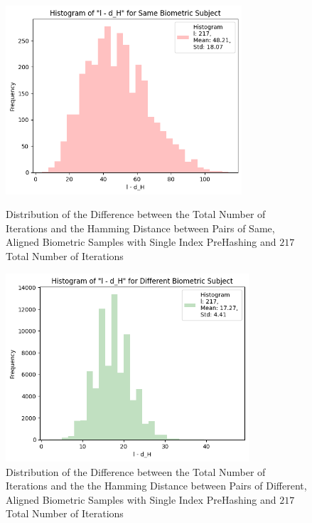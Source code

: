 \begin{enumerate}
\begin{itemize}
            \begin{figure}[H]
                \centering
                \begin{minipage}[b]{0.48\linewidth}
                    \centering
                    \includegraphics[width=\linewidth,height=7cm,keepaspectratio]{latex-img/l-dHconfig1a_same.png}
                    \caption{Distribution of the Difference between the Total Number of Iterations and the Hamming Distance between Pairs of Same, Aligned Biometric Samples with Single Index PreHashing and $217$ Total Number of Iterations}
                    \label{l-dHconfig1a_same}
                \end{minipage}
                \hfill
                \begin{minipage}[b]{0.48\linewidth}
                    \centering
                    \includegraphics[width=\linewidth,height=7cm,keepaspectratio]{latex-img/l-dHconfig1a_diff.png}
                    \caption{Distribution of the Difference between the Total Number of Iterations and the the Hamming Distance between Pairs of Different, Aligned Biometric Samples with Single Index PreHashing and $217$ Total Number of Iterations}
                    \label{l-dHconfig1a_diff}
                \end{minipage}
            \end{figure}
            

\end{itemize}
\end{enumerate}
